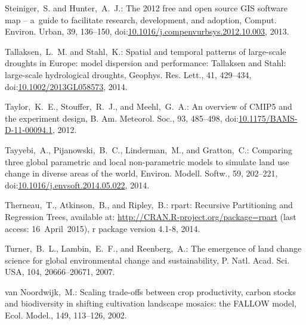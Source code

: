 \documentclass[gmdd, online, hvmath]{copernicus}
\begin{document}
\begin{thebibliography}{97}
  Steiniger,~S. and Hunter,~A.~J.: The 2012 free and open source {GIS}
  software map {--} a~guide to facilitate research, development, and
  adoption, Comput. Environ. Urban, 39, 136--150,
  doi:\href{http://dx.doi.org/10.1016/j.compenvurbsys.2012.10.003}{10.1016/j.compenvurbsys.2012.10.003}, 2013. %


  Tallaksen,~L.~M. and Stahl,~K.: Spatial and temporal patterns of
  large-scale droughts in Europe: model dispersion and performance:
  Tallaksen and Stahl: large-scale hydrological droughts,
  Geophys. Res. Lett., 41, 429--434,
doi:\href{http://dx.doi.org/10.1002/2013GL058573}{10.1002/2013GL058573}, 2014. %


  Taylor,~K.~E., Stouffer,~R.~J., and Meehl,~G.~A.: An overview of
  {CMIP5} and the experiment design, B. Am. Meteorol. Soc., 93,
  485--498,
doi:\href{http://dx.doi.org/10.1175/BAMS-D-11-00094.1}{10.1175/BAMS-D-11-00094.1}, 2012. %


 Tayyebi,~A., Pijanowski,~B.~C.,
  Linderman,~M., and Gratton,~C.: Comparing three global parametric
  and local non-parametric models to simulate land use change in
  diverse areas of the world, Environ. Modell. Softw., 59, 202--221,
  doi:\href{http://dx.doi.org/10.1016/j.envsoft.2014.05.022}{10.1016/j.envsoft.2014.05.022}, 2014.


 Therneau,~T., Atkinson,~B., and Ripley,~B.:
  rpart: Recursive Partitioning and Regression Trees, available at:
  \url{http://CRAN.R-project.org/package=rpart} (last
  access: 16~April~2015), r package
  version 4.1-8, 2014.


 Turner,~B.~L., Lambin,~E.~F., and
  Reenberg,~A.: The emergence of land change science for global
  environmental change and sustainability, P. Natl. Acad. Sci.  USA,
  104, 20666--20671, 2007.


 van Noordwijk,~M.:
  Scaling trade-offs between crop productivity, carbon stocks and
  biodiversity in shifting cultivation landscape mosaics: the {FALLOW}
  model, Ecol. Model., 149, 113--126, 2002. %



\end{thebibliography}
\end{document}
